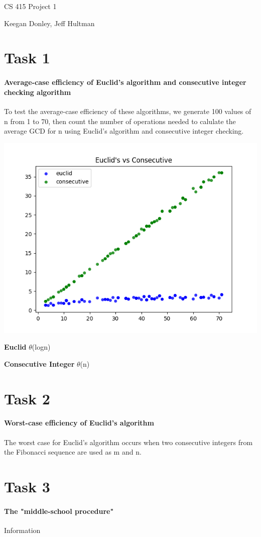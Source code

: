 \documentclass{report}
\begin{document}
	\begin{flushleft}
		\huge CS 415 Project 1
		
		\normalsize Keegan Donley, Jeff Hultman

		\section{Task 1}

		\paragraph{Average-case efficiency of Euclid's algorithm and consecutive integer checking algorithm}
		To test the average-case efficiency of these algorithms, we generate 100 values of n from 1 to 70, then count the number of
		operations needed to calulate the average GCD for n using Euclid's algorithm and consecutive integer checking.

		\includegraphics{task1}

		\textbf{Euclid} $\theta$(logn)
		
		\textbf{Consecutive Integer} $\theta$(n)

		\section{Task 2}

		\paragraph{Worst-case efficiency of Euclid's algorithm}
		The worst case for Euclid's algorithm occurs when two consecutive integers from the Fibonacci sequence are used as m and n.  

		\section{Task 3}

		\paragraph{The "middle-school procedure"}
		Information

	\end{flushleft}
\end{document}
